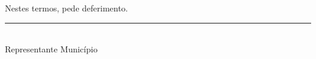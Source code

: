 Nestes termos, pede deferimento.

\centering
\begin{minipage}{0.45\textwidth}
\vspace{2cm}
\centering
\rule{\linewidth}{0.4pt}\\
{\small Representante Município}
\end{minipage}
